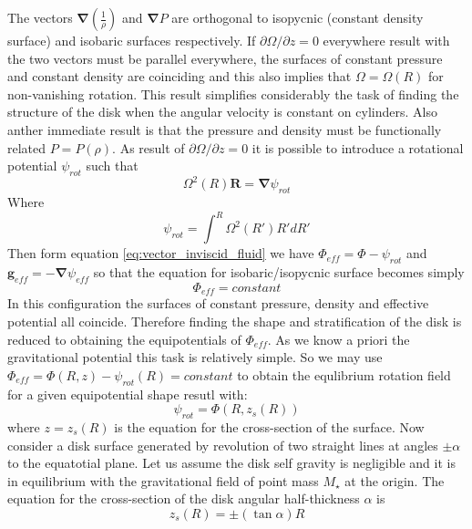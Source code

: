 \documentclass[a4paper,12pt,modern]{aastex62}
\renewcommand{\vec}[1]{\mathbf{#1}}
\begin{document}
 The vectors $ \vec\nabla\left(\frac{1}{\rho}\right)$ and $\vec\nabla P$ are orthogonal to isopycnic (constant density surface) and isobaric surfaces respectively. If $\partial \Omega/ \partial z=0$ everywhere result with the two vectors must be parallel everywhere, the surfaces of constant pressure and constant density are coinciding and this also implies that $\Omega=\Omega(R)$ for non-vanishing rotation. This result simplifies considerably the task of finding the structure of the disk when the angular velocity is constant on cylinders. Also anther immediate result is that the pressure and density must be functionally related $P=P(\rho)$.
As result of $\partial \Omega/ \partial z=0$ it is possible to introduce a rotational potential $\psi_{rot}$ such that
\begin{equation}
\Omega^2(R)\vec R = \vec \nabla \psi_{rot}
\end{equation}
Where 
\begin{equation}
\psi_{rot} = \int^R  \Omega^2(R') R' d R'
\end{equation}
Then form equation \ref{eq:vector_inviscid_fluid} we have $\Phi_{eff}=\Phi-\psi_{rot}$ and $\vec g_{eff} = -\vec \nabla \psi_{eff}$ so that the equation for isobaric/isopycnic surface becomes simply 
\begin{equation}\label{eq:phi_eff_constant}
\Phi_{eff}=constant
\end{equation}
In this configuration the surfaces of constant pressure, density and effective potential all coincide. Therefore finding the shape and stratification of the disk is reduced to obtaining the equipotentials of $\Phi_{eff}$. As we know a priori the gravitational potential this task is relatively simple. So we may use $\Phi_{eff}=\Phi(R,z)-\psi_{rot}(R)=constant$ to obtain the equlibrium rotation field for a given equipotential shape resutl with:
\begin{equation}\label{eq:rotation_potantial}
    \psi_{rot}=\Phi(R,z_s(R))
\end{equation}
where $z=z_s(R)$ is the equation for the cross-section of the surface. Now consider a disk surface generated by revolution of two straight lines at angles $\pm\alpha$ to the equatotial plane. Let us assume the disk self gravity is negligible and it is in equilibrium with the gravitational field of point mass $M_\star$ at the origin.
The equation for the cross-section of the disk angular half-thickness $\alpha$ is
\begin{equation}
z_s(R)=\pm(\tan\alpha)R
\end{equation}
\end{document}
